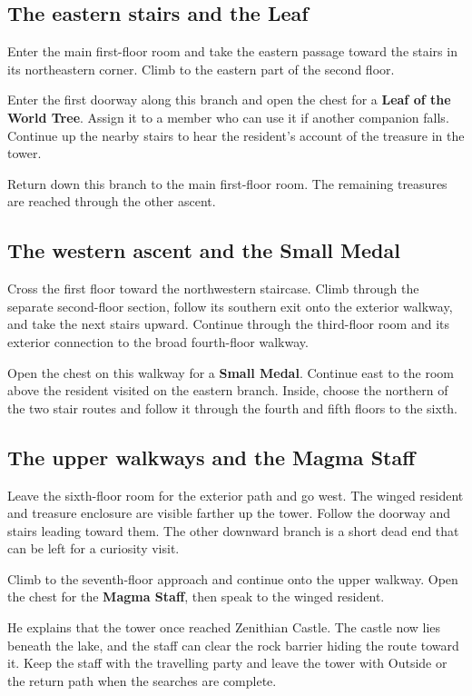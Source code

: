 \subsection*{The eastern stairs and the Leaf}

Enter the main first-floor room and take the eastern passage toward
the stairs in its northeastern corner. Climb to the eastern part
of the second floor.

Enter the first doorway along this branch and open the chest for
a \textbf{Leaf of the World Tree}. Assign it to a member who
can use it if another companion falls. Continue up the nearby stairs
to hear the resident's account of the treasure in the tower.

Return down this branch to the main first-floor room. The remaining
treasures are reached through the other ascent.

\subsection*{The western ascent and the Small Medal}

Cross the first floor toward the northwestern staircase. Climb
through the separate second-floor section, follow its southern
exit onto the exterior walkway, and take the next stairs upward.
Continue through the third-floor room and its exterior connection
to the broad fourth-floor walkway.

Open the chest on this walkway for a \textbf{Small Medal}.
Continue east to the room above the resident visited on the
eastern branch. Inside, choose the northern of the two stair routes
and follow it through the fourth and fifth floors to the sixth.

\subsection*{The upper walkways and the Magma Staff}

Leave the sixth-floor room for the exterior path and go west.
The winged resident and treasure enclosure are visible farther
up the tower. Follow the doorway and stairs leading toward them.
The other downward branch is a short dead end that can be left
for a curiosity visit.

Climb to the seventh-floor approach and continue onto the upper
walkway. Open the chest for the \textbf{Magma Staff}, then
speak to the winged resident.

He explains that the tower once reached Zenithian Castle. The
castle now lies beneath the lake, and the staff can clear the
rock barrier hiding the route toward it. Keep the staff with
the travelling party and leave the tower with Outside or the
return path when the searches are complete.


